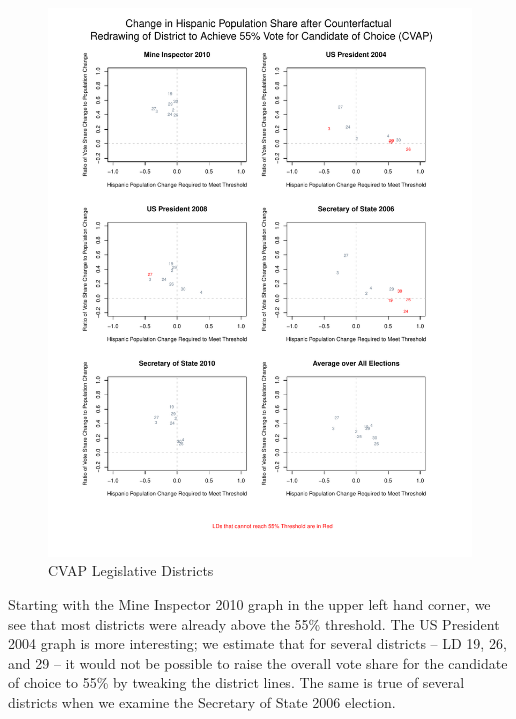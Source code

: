 \documentclass[12pt]{article}
\begin{document}
\begin{figure}[p!h]
\begin{center}
\includegraphics[scale=.8]{figs/cvap_ld_performance_ratio.pdf}
\caption{\label{cvap_ld_performance_ratio}CVAP Legislative Districts}
\end{center}
\end{figure}

Starting with the Mine Inspector 2010 graph in the upper left hand corner, we see that most districts were already above the 55\% threshold. The US President 2004 graph is more interesting; we estimate that for several districts -- LD 19, 26, and 29 -- it would not be possible to raise the overall vote share for the candidate of choice to 55\% by tweaking the district lines. The same is true of several districts when we examine the Secretary of State 2006 election. 
\end{document}
